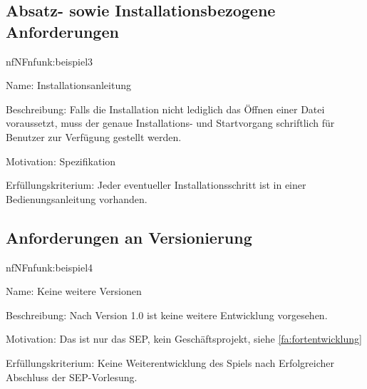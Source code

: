 %

\subsection{Absatz- sowie Installationsbezogene Anforderungen}

\begin{description}[leftmargin=5em, style=sameline]	
	\begin{lhp}{nf}{NF}{nfunk:beispiel3}
		\item [Name:] Installationsanleitung	
		\item [Beschreibung:] Falls die Installation nicht lediglich das Öffnen einer Datei voraussetzt, muss der genaue Installations- und Startvorgang schriftlich für Benutzer zur Verfügung gestellt werden.
		\item [Motivation:] Spezifikation
		\item [Erfüllungskriterium:] Jeder eventueller Installationsschritt ist in einer Bedienungsanleitung vorhanden.
	\end{lhp}
\end{description}

\subsection{Anforderungen an Versionierung}

\begin{description}[leftmargin=5em, style=sameline]	
	\begin{lhp}{nf}{NF}{nfunk:beispiel4}
		\item [Name:] Keine weitere Versionen
		\item [Beschreibung:] Nach Version 1.0 ist keine weitere Entwicklung vorgesehen.
		\item [Motivation:] Das ist nur das SEP, kein Geschäftsprojekt, siehe \ref{fa:fortentwicklung}
		\item [Erfüllungskriterium:] Keine Weiterentwicklung des Spiels nach Erfolgreicher Abschluss der SEP-Vorlesung.
	\end{lhp}
\end{description}

